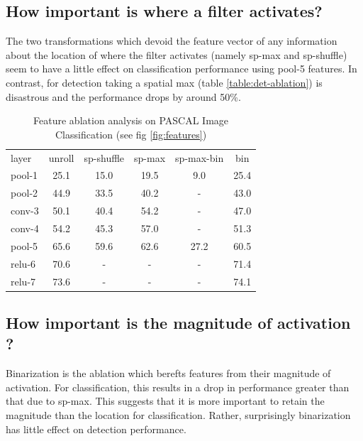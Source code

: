 \documentclass[runningheads]{llncs}
\begin{document}
\subsection{How important is where a filter activates?}
\label{sub:imp-loc}
The two transformations which devoid the feature vector of any information about the location of where the filter activates (namely sp-max and sp-shuffle) seem to have a little effect on classification performance using pool-5 features. In contrast, for detection taking a spatial max (table \ref{table:det-ablation}) is disastrous and the performance drops by around 50\%. 
\setlength{\tabcolsep}{4pt}
\begin{table}[t!]
\begin{center}
\caption{Feature ablation analysis on PASCAL Image Classification (see fig \ref{fig:features})}
\label{table:class-ablation}
\begin{tabular}{lccccc}
\hline\noalign{\smallskip}
layer & unroll & sp-shuffle & sp-max & sp-max-bin & bin \\
\noalign{\smallskip}
\hline
\noalign{\smallskip}
pool-1 & 25.1 & 15.0 & 19.5 & 9.0 & 25.4  \\ 
pool-2 & 44.9 & 33.5 & 40.2 & - &43.0 \\ 
conv-3 & 50.1 & 40.4 & 54.2 & - &47.0 \\
conv-4 & 54.2 & 45.3 & 57.0 & - &51.3  \\
pool-5 & 65.6 & 59.6 & 62.6 & 27.2 &60.5 \\
relu-6 & 70.6 &  -   &  -   & -& 71.4     \\
relu-7 & 73.6 &  -   &  -   & - &74.1     \\
\hline
\end{tabular}
\end{center}
\end{table}
\setlength{\tabcolsep}{1.4pt}

\subsection{How important is the magnitude of activation ?}
\label{sub:imp-mag}
Binarization is the ablation which berefts features from their magnitude of activation. For classification, this results in a drop in performance greater than that due to sp-max. This suggests that it is more important to retain the magnitude than the location for classification. Rather, surprisingly binarization has little effect on detection performance.
\end{document}
